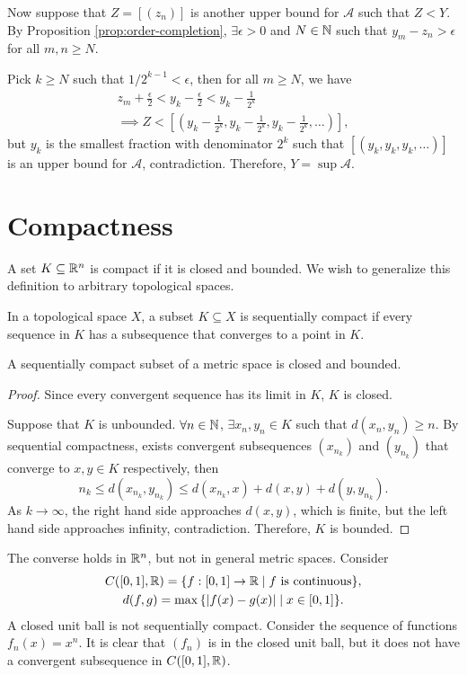 Now suppose that $Z = [(z_n)]$ is another upper bound for $\mathcal A$ such that $Z < Y$. By Proposition \ref{prop:order-completion}, $\exists \epsilon > 0$ and $N\in {\mathbb N}$ such that $y_m - z_n > \epsilon$ for all $m, n\geq N$. 

Pick $k\geq N$ such that $1/2^{k-1} < \epsilon$, then for all $m\geq N$, we have
\begin{gather*}
    z_m + \frac\epsilon2 < y_k - \frac\epsilon2 < y_k - \frac1{2^k} \\
    \implies Z < [(y_k - \frac1{2^k}, y_k - \frac1{2^k}, y_k - \frac1{2^k}, \ldots)],
\end{gather*}
but $y_k$ is the smallest fraction with denominator $2^k$ such that $[(y_k, y_k, y_k, \ldots)]$ is an upper bound for $\mathcal A$, contradiction. Therefore, $Y = \sup \mathcal A$.

\chapter{Compactness}

A set $K \subseteq {\mathbb R}^n$ is compact if it is closed and bounded. We wish to generalize this definition to arbitrary topological spaces.

\begin{df}
    In a topological space $X$, a subset $K\subseteq X$ is sequentially compact if every sequence in $K$ has a subsequence that converges to a point in $K$.
\end{df}

\begin{prop}
    A sequentially compact subset of a metric space is closed and bounded.
    \begin{proof}
        Since every convergent sequence has its limit in $K$, $K$ is closed.

        Suppose that $K$ is unbounded. $\forall n\in {\mathbb N}$, $\exists x_n, y_n \in K$ such that $d(x_n, y_n) \geq n$. By sequential compactness, exists convergent subsequences $(x_{n_k})$ and $(y_{n_k})$ that converge to $x, y \in K$ respectively, then
        \[
        n_k \leq d(x_{n_k}, y_{n_k}) \leq d(x_{n_k}, x) + d(x, y) + d(y, y_{n_k}).
        \]
        As $k\to\infty$, the right hand side approaches $d(x, y)$, which is finite, but the left hand side approaches infinity, contradiction. Therefore, $K$ is bounded.
    \end{proof}
\end{prop}

\begin{rmk}
    The converse holds in ${\mathbb R}^n$, but not in general metric spaces. Consider
    \begin{gather*}
        C([0, 1], {\mathbb R}) = {\left\{{f: [0, 1] \to {\mathbb R} \mid \text{$f$ is continuous}}\right\}}, \\
        d(f, g) = \max{\left\{{{\left| f(x) - g(x) \right|} \mid x\in [0, 1]}\right\}}.
    \end{gather*}
    A closed unit ball is not sequentially compact. Consider the sequence of functions $f_n(x) = x^n$. It is clear that $(f_n)$ is in the closed unit ball, but it does not have a convergent subsequence in $C([0, 1], {\mathbb R})$.
\end{rmk}

